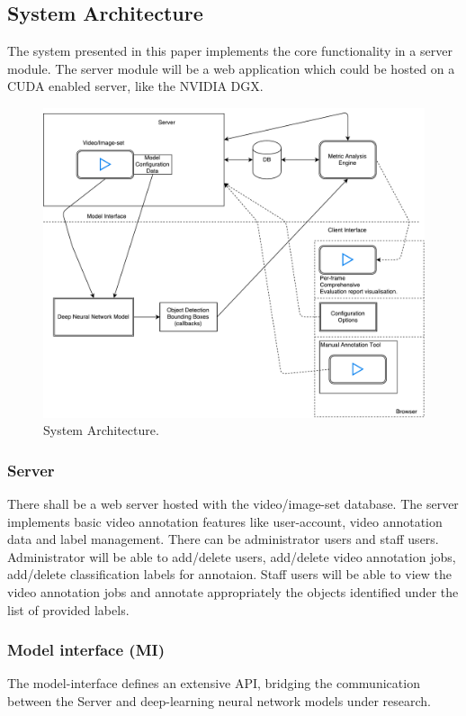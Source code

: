 \documentclass[conference]{IEEEtran}
\newcommand{\figwidthb}{0.80\linewidth}
\begin{document}
\subsection{System Architecture}
The system presented in this paper implements the core functionality in a server module. The server module will be a web application which could be hosted on a CUDA enabled server, like the NVIDIA DGX.

\begin{figure}[htb]
\centering
\includegraphics[width=\figwidthb]{fig/system_architecture.pdf}
\caption{System Architecture.} \label{fig.structure}
\end{figure}

\subsubsection{Server}
There shall be a web server hosted with the video/image-set database. The server implements basic video annotation features like user-account, video annotation data and label management. There can be administrator users and staff users. Administrator will be able to add/delete users, add/delete video annotation jobs, add/delete classification labels for annotaion. Staff users will be able to view the video annotation jobs and annotate appropriately the objects identified under the list of provided labels.
\subsubsection{Model interface (MI)}
The model-interface defines an extensive API, bridging the communication between the Server and deep-learning neural network models under research.
\end{document}

